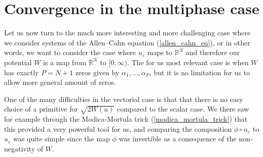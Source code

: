 \section{Convergence in the multiphase case}

Let us now turn to the much more interesting and more challenging case where we consider systems of the Allen--Cahn equation (\ref{allen_cahn_eq}), or in other words, we want to consider the case where $ u_{\varepsilon } $ maps to $ \mathbb{ R }^{ N } $ and therefore our potential $ W $ is a map from $ \mathbb{ R }^{ N } $ to $ [ 0 , \infty ) $. The for us most relevant case is when $ W $ has exactly $ P = N + 1 $ zeros given by $ \alpha_{ 1 } , \dotsc, \alpha_{ P } $, but it is no limitation for us to allow more general amount of zeros.

One of the many difficulties in the vectorial case is that that there is no easy choice of a primitive for $ \sqrt{ 2 W ( u ) } $ compared to the scalar case. We there saw for example through the Modica-Mortula trick (\ref{modica_mortula_trick}) that this provided a very powerful tool for us, and comparing the composition $ \phi \circ u_{ \varepsilon } $ to $ u_{ \varepsilon } $ was quite simple since the map $ \phi $ was invertible as a consequence of the non-negativity of $ W $.



